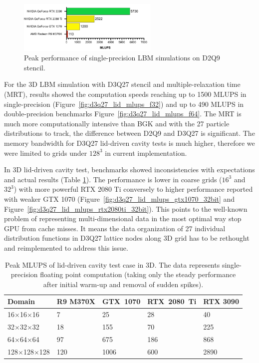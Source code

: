 \begin{figure}[!ht]
	\centering
	\includegraphics[width=0.6\textwidth]{data/max_mlups_2d.pdf}
	\caption{Peak performance of single-precision LBM simulations on D2Q9 stencil.}
	\label{fig:max_mlups}
\end{figure}

For the 3D LBM simulation with D3Q27 stencil and multiple-relaxation time (MRT), results showed the computation speeds reaching up to 1500 MLUPS in single-precision (Figure~\ref{fig:d3q27_lid_mlups_f32}) and up to 490 MLUPS in double-precision benchmarks Figure~\ref{fig:d3q27_lid_mlups_f64}. The MRT is much more computationally intensive than BGK and with the 27 particle distributions to track, the difference between D2Q9 and D3Q27 is significant. The memory bandwidth for D3Q27 lid-driven cavity tests is much higher, therefore we were limited to grids under $128^3$ in current implementation.

In 3D lid-driven cavity test, benchmarks showed inconsistencies with expectations and actual results (Table \ref{tab:lid-mlups-all-3d}). The performance is lower in coarse grids ($16^3$ and $32^3$) with more powerful RTX 2080 Ti conversely to higher performance reported with weaker GTX 1070 (Figure~\ref{fig:d3q27_lid_mlups_gtx1070_32bit} and Figure~\ref{fig:d3q27_lid_mlups_rtx2080ti_32bit}). This points to the well-known problem of representing multi-dimensional data in the most optimal way stop GPU from cache misses. It means the data organization of 27 individual distribution functions in D3Q27 lattice nodes along 3D grid has to be rethought and reimplemented to address this issue.  

\begin{table}[!ht]
	\centering
	\begin{tabular}{ |p{3.5cm}||p{2.2cm}|p{2.2cm}|p{2.4cm}|p{2.2cm}|  }
		\hline
		Domain & R9 M370X & GTX~1070 & RTX~2080~Ti & RTX 3090 \\
		\hline
		16$\times$16$\times$16   & 7 & 25  & 28  & 40  \\
		32$\times$32$\times$32   & 18 & 155  & 70   & 225  \\
		64$\times$64$\times$64   & 97 & 675  & 186   & 868  \\
		128$\times$128$\times$128   & 120 & 1006  & 600   & 2890  \\
		\hline
	\end{tabular}
	\caption{Peak MLUPS of lid-driven cavity test case in 3D. The data represents single-precision floating point computation (taking only the steady performance after initial warm-up and removal of sudden spikes).}
	\label{tab:lid-mlups-all-3d}
\end{table}


